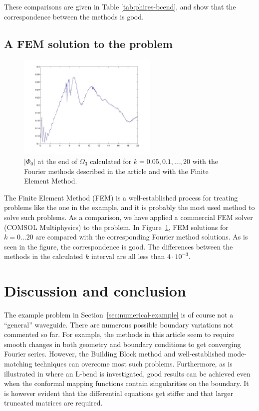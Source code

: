 \documentclass[numreferences]{kluwer}
\providecommand{\abs}[1]{\left\lvert#1\right\rvert}
\renewcommand{\Phi}{\varPhi}
\renewcommand{\Phi}{\varPhi}
\begin{document}
These comparisons are given in Table \ref{tab:phires-bcend}, and show
that the correspondence between the methods is good.

\subsection{A FEM solution to the problem}
\label{sec:fem-solution-problem}

\begin{figure}[htb]
  \centering
  \includegraphics[keepaspectratio=false,height=5cm,width=\textwidth]
  {FEMvsFourier}
  \caption{$\abs{\Phi_{0}}$ at the end of $\Omega_3$ calculated for
    $k=0.05,0.1,\dots,20$ with the Fourier methods described in the
    article and with the Finite Element Method.}
  \label{fig:FEMvsFourier}
\end{figure}

The Finite Element Method (FEM) is a well-established process for
treating problems like the one in the example, and it is probably the
most used method to solve such problems. As a comparison, we have
applied a commercial FEM solver (COMSOL Multiphysics) to the
problem. In Figure~\ref{fig:FEMvsFourier}, FEM solutions for $k=0\dots20$
are compared with the corresponding Fourier method solutions. As is
seen in the figure, the correspondence is good. The differences
between the methods in the calculated $k$ interval are all less than
$4\cdot10^{-3}$.


\section{Discussion and conclusion}
\label{sec:conclusion}

The example problem in Section~\ref{sec:numerical-example} is of
course not a ``general'' wave\-guide. There are numerous possible
boundary variations not commented so far. For example, the methods in
this article seem to require smooth changes in both geometry and
boundary conditions to get converging Fourier series. However, the
Building Block method and well-established mode-matching techniques
can overcome most such problems. Furthermore, as is illustrated in
\cite{Nilsson:2002} where an L-bend is investigated, good results can
be achieved even when the conformal mapping functions contain
singularities on the boundary. It is however evident that the
differential equations get stiffer and that larger truncated matrices
are required.
\end{document}
